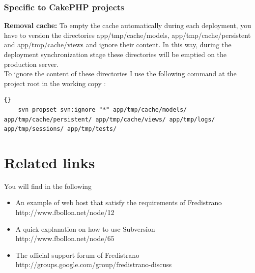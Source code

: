 \documentclass[12pt,a4paper]{report}
\begin{document}
\subsection{Specific to CakePHP projects} %
\begin{list}{-}{}
	\item \textbf{Removal cache:} To empty the cache automatically during each deployment, you have to version the directories app/tmp/cache/models, app/tmp/cache/persistent and app/tmp/cache/views and ignore their content. In this way, during the deployment synchronization stage these directories will be emptied on the production server.\\
	To ignore the content of these directories I use the following command at the project root in the working copy :
	\lstset{language=bash}
	\lstset{breaklines=true}
	\lstset{tabsize=1}
	\begin{lstlisting}[frame=tb]{}
	svn propset svn:ignore "*" app/tmp/cache/models/ app/tmp/cache/persistent/ app/tmp/cache/views/ app/tmp/logs/ app/tmp/sessions/ app/tmp/tests/
	\end{lstlisting}
\end{list}




\chapter{Related links}
You will find in the following 
\begin{itemize}
\item An example of web host that satisfy the requirements of Fredistrano \\ http://www.fbollon.net/node/12 \\
\item A quick explanation on how to use Subversion \\ http://www.fbollon.net/node/65 \\
\item The official support forum of Fredistrano \\ http://groups.google.com/group/fredistrano-discuss
\end{itemize}
\end{document}

